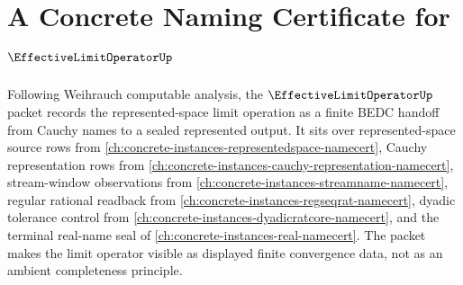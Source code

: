 \chapter{A Concrete Naming Certificate for $\EffectiveLimitOperatorUp$}
\label{ch:concrete-instances-effective-limit-operator-namecert}

Following Weihrauch computable analysis, the $\EffectiveLimitOperatorUp$ packet records the represented-space limit operation as a finite BEDC handoff from Cauchy names to a sealed represented output. It sits over represented-space source rows from \autoref{ch:concrete-instances-representedspace-namecert}, Cauchy representation rows from \autoref{ch:concrete-instances-cauchy-representation-namecert}, stream-window observations from \autoref{ch:concrete-instances-streamname-namecert}, regular rational readback from \autoref{ch:concrete-instances-regseqrat-namecert}, dyadic tolerance control from \autoref{ch:concrete-instances-dyadicratcore-namecert}, and the terminal real-name seal of \autoref{ch:concrete-instances-real-namecert}. The packet makes the limit operator visible as displayed finite convergence data, not as an ambient completeness principle.

